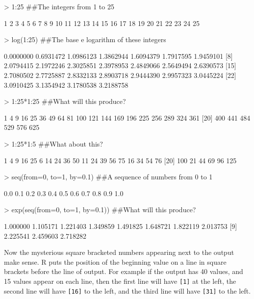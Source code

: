 \begin{Schunk}
\begin{Sinput}
> 1:25 ##The integers from 1 to 25
\end{Sinput}
\begin{Soutput}
 [1]  1  2  3  4  5  6  7  8  9 10 11 12 13 14 15 16 17 18 19 20 21 22 23 24 25
\end{Soutput}
\begin{Sinput}
> log(1:25) ##The base e logarithm of these integers
\end{Sinput}
\begin{Soutput}
 [1] 0.0000000 0.6931472 1.0986123 1.3862944 1.6094379 1.7917595 1.9459101
 [8] 2.0794415 2.1972246 2.3025851 2.3978953 2.4849066 2.5649494 2.6390573
[15] 2.7080502 2.7725887 2.8332133 2.8903718 2.9444390 2.9957323 3.0445224
[22] 3.0910425 3.1354942 3.1780538 3.2188758
\end{Soutput}
\begin{Sinput}
> 1:25*1:25 ##What will this produce?
\end{Sinput}
\begin{Soutput}
 [1]   1   4   9  16  25  36  49  64  81 100 121 144 169 196 225 256 289 324 361
[20] 400 441 484 529 576 625
\end{Soutput}
\begin{Sinput}
> 1:25*1:5 ##What about this?
\end{Sinput}
\begin{Soutput}
 [1]   1   4   9  16  25   6  14  24  36  50  11  24  39  56  75  16  34  54  76
[20] 100  21  44  69  96 125
\end{Soutput}
\begin{Sinput}
> seq(from=0, to=1, by=0.1) ##A sequence of numbers from 0 to 1
\end{Sinput}
\begin{Soutput}
 [1] 0.0 0.1 0.2 0.3 0.4 0.5 0.6 0.7 0.8 0.9 1.0
\end{Soutput}
\begin{Sinput}
> exp(seq(from=0, to=1, by=0.1)) ##What will this produce?
\end{Sinput}
\begin{Soutput}
 [1] 1.000000 1.105171 1.221403 1.349859 1.491825 1.648721 1.822119 2.013753
 [9] 2.225541 2.459603 2.718282
\end{Soutput}
\end{Schunk}

Now the mysterious square bracketed numbers appearing next to the output make sense. R puts the position of the beginning value on a line in square brackets before the line of output. For example if the output has 40 values, and 15 values appear on each line, then the first line will have \verb+[1]+ at the left, the second line will have \verb+[16]+ to the left, and the third line will have \verb+[31]+ to the left.

